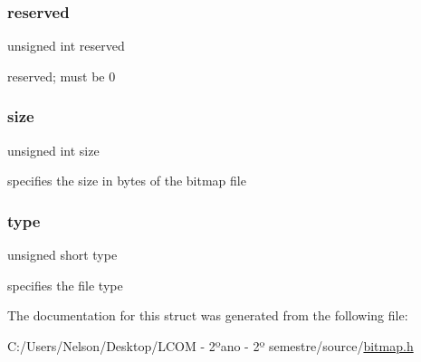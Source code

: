 \subsubsection{\texorpdfstring{reserved}{reserved}}
{\footnotesize\ttfamily unsigned int reserved}

reserved; must be 0 \mbox{\label{struct_bitmap_file_header_aac913b3a1f6ef005d66bf7a84428773e}} 
\subsubsection{\texorpdfstring{size}{size}}
{\footnotesize\ttfamily unsigned int size}

specifies the size in bytes of the bitmap file \mbox{\label{struct_bitmap_file_header_aa929142c5ddf34cf0915c97a617a1a63}} 
\subsubsection{\texorpdfstring{type}{type}}
{\footnotesize\ttfamily unsigned short type}

specifies the file type 

The documentation for this struct was generated from the following file\+:\begin{DoxyCompactItemize}
\item 
C\+:/\+Users/\+Nelson/\+Desktop/\+L\+C\+O\+M -\/ 2ºano -\/ 2º semestre/source/\hyperlink{bitmap_8h}{bitmap.\+h}\end{DoxyCompactItemize}
